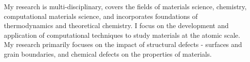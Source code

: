 \vspace{0.25cm}

\begin{cvparagraph}

My research is multi-disciplinary, covers the fields of materials science, chemistry, computational materials science, and incorporates foundations of thermodynamics and theoretical chemistry. 
I focus on the development and application of computational techniques to study materials at the atomic scale. 
My research primarily focuses on the impact of structural defects - surfaces and grain boundaries, and chemical defects on the properties of materials. 
\end{cvparagraph}